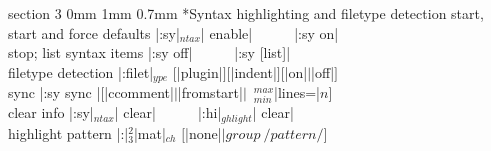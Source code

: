 \documentclass[10pt,a4paper,landscape]{article}
\makeatletter
\renewcommand{\section}{\@startsection		%
	{section}
	{3}
	{0mm}
	{1mm}
	{0.7mm}
	{\normalfont\bfseries\footnotesize}}
\newcommand{\opt}[1]{$_{#1}$}
\newcommand{\OPT}[2]{$_{#1}^{#2}$}
\newcommand{\w}{{~~~}}
\makeatother
\begin{document}
\begin{multicols}{4}
{{\section*{Syntax highlighting and filetype detection}
start, start and force defaults		\dotfill|:sy|\opt{ntax}| enable|\w\w|:sy on|\\
stop; list syntax items			\dotfill|:sy off|\w\w|:sy [list]|\\
filetype detection	    \dotfill|:filet|\opt{ype} $[$|plugin|$] [$|indent|$] [$|on|$\vert$|off|$]$\\
sync			    \dotfill|:sy sync |$[$|ccomment|$\vert$|fromstart|$\vert$~\OPT{min}{max}|lines=|$n]$\\
clear info		    \dotfill|:sy|\opt{ntax}| clear|\w\w|:hi|\opt{ghlight}| clear|\\
highlight pattern	    \dotfill|:|\OPT{3}{2}|mat|\opt{ch} $[$|none|$\vert group~/pattern/]$
}}
\end{multicols}
\end{document}
